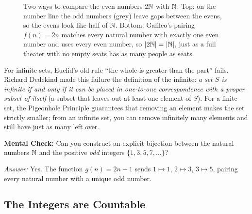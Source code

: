 \begin{figure}[htbp]
\caption{Two ways to compare the even numbers $2\mathbb{N}$ with $\mathbb{N}$. Top: on the number line the odd numbers (grey) leave gaps between the evens, so the evens look like half of $\mathbb{N}$. Bottom: Galileo's pairing $f(n) = 2n$ matches every natural number with exactly one even number and uses every even number, so $|2\mathbb{N}| = |\mathbb{N}|$, just as a full theater with no empty seats has as many people as seats.}
\label{19:fig-stadium-galileo}
\end{figure}

For infinite sets, Euclid's old rule ``the whole is greater than the part'' fails. Richard Dedekind made this failure the definition of the infinite: \emph{a set $S$ is infinite if and only if it can be placed in one-to-one correspondence with a proper subset of itself} (a subset that leaves out at least one element of $S$). For a finite set, the Pigeonhole Principle guarantees that removing an element makes the set strictly smaller; from an infinite set, you can remove infinitely many elements and still have just as many left over.

\begin{recoverybox}
\textbf{Mental Check:} Can you construct an explicit bijection between the natural numbers $\mathbb{N}$ and the positive \emph{odd} integers $\{1, 3, 5, 7, \dots\}$?
\par\vspace{0.3em}
\emph{Answer:} Yes. The function $g(n) = 2n - 1$ sends $1 \mapsto 1$, $2 \mapsto 3$, $3 \mapsto 5$, pairing every natural number with a unique odd number.
\end{recoverybox}

\subsection{The Integers are Countable}

